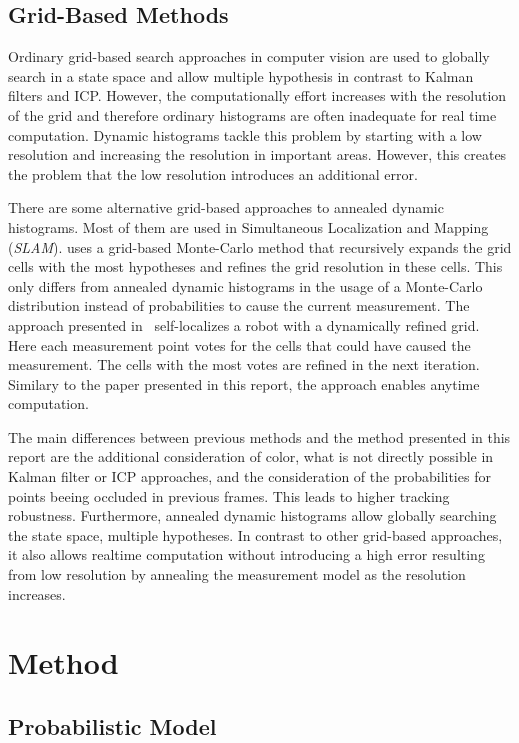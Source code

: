 \documentclass[twoside,a4paper,article]{combine}
\begin{document}
\subsection{Grid-Based Methods}
\label{sub:grid-based-methods}
Ordinary grid-based search approaches in computer vision are used to
globally search in a state space and allow multiple hypothesis in
contrast to Kalman filters and ICP. However, the computationally
effort increases with the resolution of the grid and therefore
ordinary histograms are often inadequate for real time computation.
Dynamic histograms tackle this problem by starting with a low
resolution and increasing the resolution in important areas. However,
this creates the problem that the low resolution introduces an
additional error.

There are some alternative grid-based approaches to annealed dynamic
histograms. Most of them are used in Simultaneous Localization and
Mapping (\textit{SLAM}). \cite{multi-res-grid-slam2} uses a grid-based
Monte-Carlo method that recursively expands the grid cells with the
most hypotheses and refines the grid resolution in these cells. This
only differs from annealed dynamic histograms in the usage of a
Monte-Carlo distribution instead of probabilities to cause the current
measurement. The approach presented in~\cite{multi-res-grid-slam}
self-localizes a robot with a dynamically refined grid. Here each
measurement point votes for the cells that could have caused the
measurement. The cells with the most votes are refined in the next
iteration. Similary to the paper presented in this report, the
approach enables anytime computation.

The main differences between previous methods and the method presented
in this report are the additional consideration of color, what is not
directly possible in Kalman filter or ICP approaches, and the
consideration of the probabilities for points beeing occluded in
previous frames. This leads to higher tracking
robustness. Furthermore, annealed dynamic histograms allow globally
searching the state space, multiple hypotheses. In contrast to other
grid-based approaches, it also allows realtime computation without
introducing a high error resulting from low resolution by
annealing the measurement model as the resolution increases.

\section{Method}
\label{sec:method}
\subsection{Probabilistic Model}
\label{sub:probabilistic-model}
\end{document}
